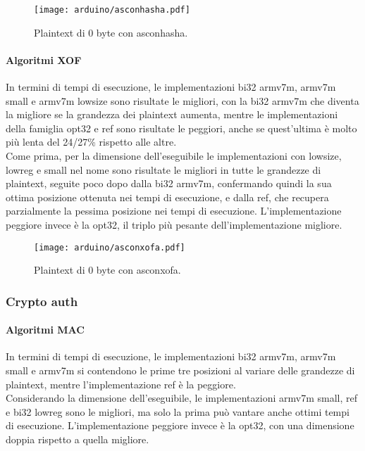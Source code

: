 \begin{figure}[H]
    \centering
    \texttt{[image: arduino/asconhasha.pdf]}
    \caption{Plaintext di 0 byte con asconhasha.}
\end{figure}

\paragraph{Algoritmi XOF}

In termini di tempi di esecuzione, le implementazioni bi32 armv7m, armv7m small e armv7m lowsize sono risultate le migliori, con la bi32 armv7m che diventa la migliore se la grandezza dei plaintext aumenta, mentre le implementazioni della famiglia opt32 e ref sono risultate le peggiori, anche se quest'ultima è molto più lenta del 24/27\% rispetto alle altre. \\

\noindent Come prima, per la dimensione dell'eseguibile le implementazioni con lowsize, lowreg e small nel nome sono risultate le migliori in tutte le grandezze di plaintext, seguite poco dopo dalla bi32 armv7m, confermando quindi la sua ottima posizione ottenuta nei tempi di esecuzione, e dalla ref, che recupera parzialmente la pessima posizione nei tempi di esecuzione. L'implementazione peggiore invece è la opt32, il triplo più pesante dell'implementazione migliore.

\begin{figure}[H]
    \centering
    \texttt{[image: arduino/asconxofa.pdf]}
    \caption{Plaintext di 0 byte con asconxofa.}
\end{figure}

\subsubsection{Crypto auth}

\paragraph{Algoritmi MAC}

In termini di tempi di esecuzione, le implementazioni bi32 armv7m, armv7m small e armv7m si contendono le prime tre posizioni al variare delle grandezze di plaintext, mentre l'implementazione ref è la peggiore. \\

\noindent Considerando la dimensione dell'eseguibile, le implementazioni armv7m small, ref e bi32 lowreg sono le migliori, ma solo la prima può vantare anche ottimi tempi di esecuzione. L'implementazione peggiore invece è la opt32, con una dimensione doppia rispetto a quella migliore.


